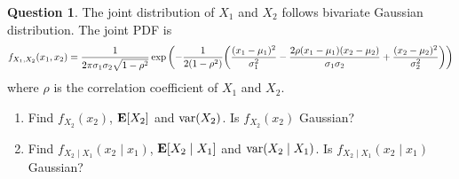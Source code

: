 \documentclass[utf8]{article}
\theoremstyle{definition}%
\newtheorem{question}{Question} %
\theoremstyle{plain}%
\begin{document}
\begin{question}
    The joint distribution of $X_1$ and $X_2$ follows bivariate Gaussian distribution. The joint PDF is
    \begin{equation}
        f_{X_1, X_2}(x_1, x_2) = \frac{1}{2\pi \sigma_1\sigma_2 \sqrt{1 - \rho^2}} \exp\qty(-\frac{1}{2(1 - \rho^2)} \qty(\frac{(x_1-\mu_1)^2}{\sigma_1^2} - \frac{2\rho(x_1-\mu_1)(x_2-\mu_2)}{\sigma_1\sigma_2} + \frac{(x_2-\mu_2)^2}{\sigma_2^2}))
    \end{equation}
    where $\rho$ is the correlation coefficient of $X_1$ and $X_2$.
    \begin{enumerate}[label=(\alph*)]
        \item Find $f_{X_2}(x_2)$, $\mathbf{E}[X_2]$ and $\mathrm{var}(X_2)$. Is $f_{X_2}(x_2)$ Gaussian?
        \item Find $f_{X_2 \mid X_1}(x_2 \mid x_1)$, $\mathbf{E}[X_2 \mid X_1]$ and $\mathrm{var}(X_2 \mid X_1)$. Is $f_{X_2 \mid X_1}(x_2 \mid x_1)$ Gaussian?
    \end{enumerate}
\end{question}
\end{document}
